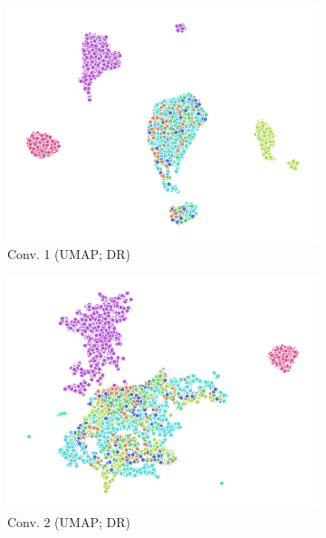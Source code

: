 \begin{figure}
  \begin{subfigure}{0.22\textwidth}
    \includegraphics[width=\textwidth]{figures/chapter6/embeddings/jaco_DR_prop_conv1_UMAP.png}
    \caption{Conv. 1 (UMAP; DR)}
  \end{subfigure}
  \begin{subfigure}{0.22\textwidth}
    \includegraphics[width=\textwidth]{figures/chapter6/embeddings/jaco_DR_prop_conv2_UMAP.png}
    \caption{Conv. 2 (UMAP; DR)}
  \end{subfigure}
  \begin{subfigure}{0.22\textwidth}

\end{subfigure}
\end{figure}
